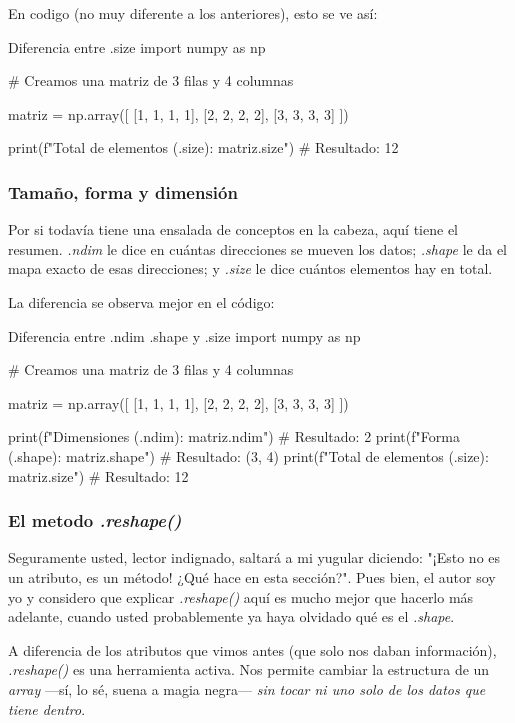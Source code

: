 En codigo (no muy diferente a los anteriores), esto se ve así:

\begin{pycode}{Diferencia entre .size}
import numpy as np

# Creamos una matriz de 3 filas y 4 columnas

matriz = np.array([
[1, 1, 1, 1],
[2, 2, 2, 2],
[3, 3, 3, 3]
])

print(f"Total de elementos (.size): {matriz.size}") # Resultado: 12
\end{pycode}


\subsubsection{Tamaño, forma y dimensión}

Por si todavía tiene una ensalada de conceptos en la cabeza, aquí tiene el resumen. \textit{.ndim} le dice en cuántas direcciones se mueven los datos; \textit{.shape} le da el mapa exacto de esas direcciones; y \textit{.size} le dice cuántos elementos hay en total.

La diferencia se observa mejor en el código:
\begin{pycode}{Diferencia entre .ndim .shape y .size}
import numpy as np

# Creamos una matriz de 3 filas y 4 columnas

matriz = np.array([
[1, 1, 1, 1],
[2, 2, 2, 2],
[3, 3, 3, 3]
])

print(f"Dimensiones (.ndim): {matriz.ndim}")  # Resultado: 2
print(f"Forma (.shape): {matriz.shape}")      # Resultado: (3, 4)
print(f"Total de elementos (.size): {matriz.size}") # Resultado: 12
\end{pycode}


\subsubsection{El metodo \textit{.reshape()}}

Seguramente usted, lector indignado, saltará a mi yugular diciendo: "¡Esto no es un atributo, es un método! ¿Qué hace en esta sección?". Pues bien, el autor soy yo y considero que explicar \textit{.reshape()} aquí es mucho mejor que hacerlo más adelante, cuando usted probablemente ya haya olvidado qué es el \textit{.shape}.

A diferencia de los atributos que vimos antes (que solo nos daban información), \textit{.reshape()} es una herramienta activa. Nos permite cambiar la estructura de un \textit{array} —sí, lo sé, suena a magia negra— \textit{sin tocar ni uno solo de los datos que tiene dentro}.

